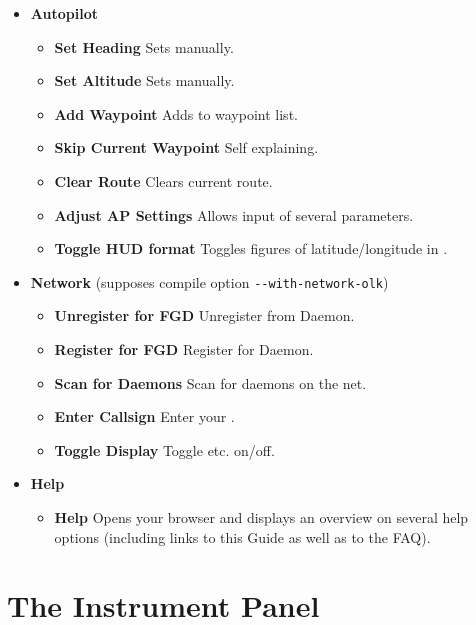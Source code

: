 \begin{itemize}
 \item \textbf{Autopilot}
 \begin{itemize}
 \item \textbf{Set Heading} Sets  manually.
 \item \textbf{Set Altitude} Sets  manually.
 \item \textbf{Add Waypoint} Adds  to waypoint list.
 \item \textbf{Skip Current Waypoint} Self explaining.
 \item \textbf{Clear Route} Clears current route.
 \item \textbf{Adjust AP Settings} Allows input of several  parameters.
 \item \textbf{Toggle HUD format} Toggles figures of latitude/longitude in .
 \end{itemize}
 
 \item\textbf{Network} (supposes compile option \texttt{-$ $-with-network-olk})
 \begin{itemize}
 \item \textbf{Unregister for FGD} Unregister from \FlightGear{} Daemon.
 \item \textbf{Register for FGD} Register for \FlightGear{} Daemon.
 \item \textbf{Scan for Daemons} Scan for daemons on the net.
 \item \textbf{Enter Callsign} Enter your . 
 \item \textbf{Toggle Display} Toggle  etc. on/off. 
 
 \end{itemize}

 \item \textbf{Help}
 \begin{itemize}
 \item \textbf{Help} Opens your browser and displays an overview on several help options (including links to this Guide as well as to the FAQ). 
 \end{itemize}
\end{itemize}

\section{The Instrument Panel}

